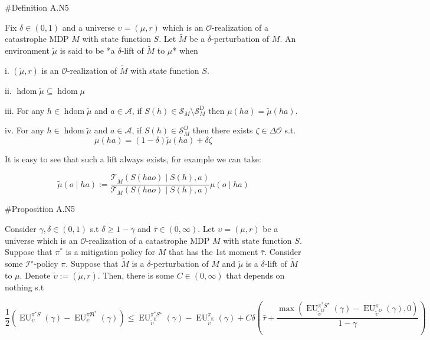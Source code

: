\documentclass[a4paper]{article}
\newcommand{\Comment}[1]{}
\newcommand{\AP}[1]{\left(#1\right)}
\newcommand{\M}{\xrightarrow{\textnormal{k}}}
\newcommand{\Ob}{\mathcal{O}}
\newcommand{\A}{\mathcal{A}}
\newcommand{\St}{\mathcal{S}}
\newcommand{\T}{\mathcal{T}}
\newcommand{\In}{\mathcal{I}}
\newcommand{\FH}{(\A \times \Ob)^*}
\DeclareMathOperator{\HD}{hdom}
\newcommand{\RMD}{\mathrm{D}}
\newcommand{\RME}{\mathrm{E}}
\newcommand{\RMF}{\mathrm{F}}
\newcommand{\SF}{\St^{\RMF}}
\newcommand{\SD}{\St^{\RMD}}
\newcommand{\EU}{\operatorname{EU}}
\begin{document}
\Comment{\#Definition A.N4

Consider $\delta\in(0,1)$, a universe $\upsilon=(\mu,r)$, a catastrophe MDP $M$ and some $S: \FH \rightarrow \St_M \sqcup \{\bot\}$. Let $\pi: \FH \M \A$ be any policy. A policy $\tilde{\pi}: \FH \M \A$ is said to be a *$\delta$-perturbation of $\pi$ over $S$* when

i. For any $h \in \HD{\mu}$ s.t. $S(h)\in\SF_M$, $\tilde{\pi}(h)=\pi(h)$.

ii. For any $h \in \HD{\mu}$ s.t. $S(h)\in\SD_M$, there exists $\alpha\in\Delta\A$ s.t $\pi(h)=(1-\delta)\tilde{\pi}(h)+\delta\alpha$.}

\#Definition A.N5

Fix $\delta\in(0,1)$ and a universe $\upsilon=(\mu,r)$ which is an $\Ob$-realization of a catastrophe MDP $M$ with state function $S$. Let $\tilde{M}$ be a $\delta$-perturbation of $M$. An environment $\tilde{\mu}$ is said to be *a $\delta$-lift of $\tilde{M}$ to $\mu$* when

i. $(\tilde{\mu},r)$ is an $\Ob$-realization of $\tilde{M}$ with state function $S$.

ii. $\HD{\tilde{\mu}} \subseteq \HD{\mu}$

iii. For any $h \in \HD{\tilde{\mu}}$ and $a\in\A$, if $S(h) \in \St_M \setminus \SD_M$ then $\mu(ha) = \tilde{\mu}(ha)$.

iv. For any $h \in \HD{\tilde{\mu}}$ and $a\in\A$, if $S(h)\in\SD_M$ then there exists $\zeta\in\Delta\Ob$ s.t. $$\mu(ha) = (1-\delta)\tilde{\mu}(ha) + \delta\zeta$$

It is easy to see that such a lift always exists, for example we can take:

$$\tilde{\mu}(o \mid ha) := \frac{\T_{\tilde{M}}\AP{S(hao) \mid S(h),a}}{\T_{M}\AP{S(hao) \mid S(h),a}}\mu(o \mid ha)$$

\#Proposition A.N5

Consider $\gamma,\delta\in(0,1)$ s.t $\delta \geq 1 - \gamma$ and $\bar{\tau}\in(0,\infty)$. Let $\upsilon=(\mu,r)$ be a universe which is an $\Ob$-realization of a catastrophe MDP $M$ with state function $S$. Suppose that $\pi^*$ is a mitigation policy for $M$ that has the 1st moment $\bar{\tau}$. Consider some $\In^\star$-policy $\pi$. Suppose that $\tilde{M}$ is a $\delta$-perturbation of $M$ and $\tilde{\mu}$ is a $\delta$-lift of $\tilde{M}$ to $\mu$. Denote $\tilde{\upsilon}:=(\tilde{\mu},r)$. Then, there is some $C\in(0,\infty)$ that depends on nothing s.t

$$\frac{1}{2}\AP{\EU_{\upsilon}^{\pi^* S}(\gamma)-\EU_{\upsilon}^{\pi\Re^*}(\gamma)} \leq \EU_{\tilde{\upsilon}^{\RME}}^{\pi^* S^\star}(\gamma)-\EU_{\tilde{\upsilon}^{\RME}}^{\pi}(\gamma) + C\delta\AP{\bar{\tau}+\frac{\max\AP{\EU_{\tilde{\upsilon}^{\RMD}}^{\pi^* S^\star}(\gamma)-\EU_{\tilde{\upsilon}^{\RMD}}^{\pi}(\gamma),0}}{1-\gamma}}$$
\end{document}
